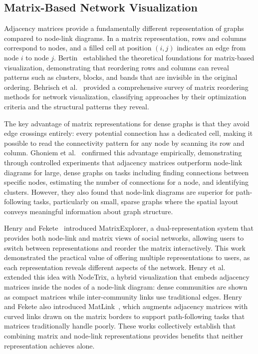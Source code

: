 \documentclass[conference]{IEEEtran}
\begin{document}
\subsection{Matrix-Based Network Visualization}

Adjacency matrices provide a fundamentally different representation of graphs compared to node-link diagrams. In a matrix representation, rows and columns correspond to nodes, and a filled cell at position $(i, j)$ indicates an edge from node $i$ to node $j$. Bertin~\cite{bertin1983semiology} established the theoretical foundations for matrix-based visualization, demonstrating that reordering rows and columns can reveal patterns such as clusters, blocks, and bands that are invisible in the original ordering. Behrisch et al.~\cite{behrisch2016reordering} provided a comprehensive survey of matrix reordering methods for network visualization, classifying approaches by their optimization criteria and the structural patterns they reveal.

The key advantage of matrix representations for dense graphs is that they avoid edge crossings entirely: every potential connection has a dedicated cell, making it possible to read the connectivity pattern for any node by scanning its row and column. Ghoniem et al.~\cite{ghoniem2004comparison} confirmed this advantage empirically, demonstrating through controlled experiments that adjacency matrices outperform node-link diagrams for large, dense graphs on tasks including finding connections between specific nodes, estimating the number of connections for a node, and identifying clusters. However, they also found that node-link diagrams are superior for path-following tasks, particularly on small, sparse graphs where the spatial layout conveys meaningful information about graph structure.

Henry and Fekete~\cite{henry2006matrixexplorer} introduced MatrixExplorer, a dual-representation system that provides both node-link and matrix views of social networks, allowing users to switch between representations and reorder the matrix interactively. This work demonstrated the practical value of offering multiple representations to users, as each representation reveals different aspects of the network. Henry et al.~\cite{henry2007nodetrix} extended this idea with NodeTrix, a hybrid visualization that embeds adjacency matrices inside the nodes of a node-link diagram: dense communities are shown as compact matrices while inter-community links use traditional edges. Henry and Fekete also introduced MatLink~\cite{henry2007matlink}, which augments adjacency matrices with curved links drawn on the matrix borders to support path-following tasks that matrices traditionally handle poorly. These works collectively establish that combining matrix and node-link representations provides benefits that neither representation achieves alone.
\end{document}
